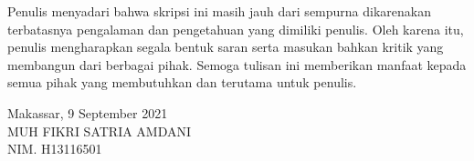 Penulis menyadari bahwa skripsi ini masih jauh dari sempurna dikarenakan terbatasnya pengalaman dan pengetahuan yang dimiliki penulis. Oleh karena itu, penulis mengharapkan segala bentuk saran serta masukan bahkan kritik yang membangun dari berbagai pihak. Semoga tulisan ini memberikan manfaat kepada semua pihak yang membutuhkan dan terutama untuk penulis.

\vspace{1cm}
\begin{flushright}
    Makassar, 9 September 2021\\
    \vspace{2.5cm}
    {MUH FIKRI SATRIA AMDANI}\\
    NIM. {H13116501}
\end{flushright}